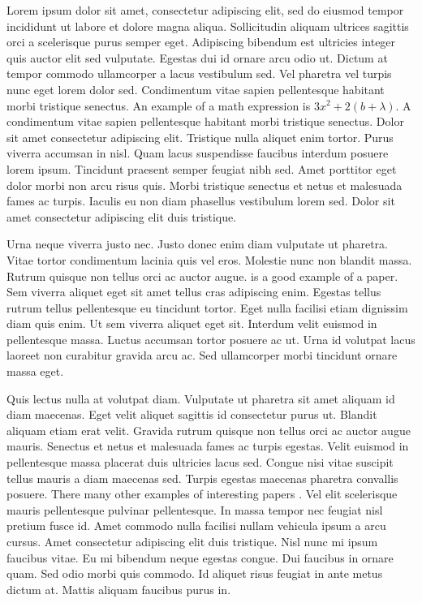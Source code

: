 \documentclass[12pt, letterpaper]{article}
\begin{document}
Lorem ipsum dolor sit amet, consectetur adipiscing elit, sed do eiusmod tempor 
incididunt ut labore et dolore magna aliqua. Sollicitudin aliquam ultrices 
sagittis orci a scelerisque purus semper eget. Adipiscing bibendum est ultricies 
integer quis auctor elit sed vulputate. Egestas dui id ornare arcu odio ut. 
Dictum at tempor commodo ullamcorper a lacus vestibulum sed. Vel pharetra vel 
turpis nunc eget lorem dolor sed. Condimentum vitae sapien pellentesque habitant 
morbi tristique senectus. An example of a math expression is 
$3x^2 + 2(b + \lambda)$. A condimentum vitae 
sapien pellentesque habitant morbi 
tristique senectus. Dolor sit amet consectetur adipiscing elit. Tristique nulla 
aliquet enim tortor. Purus viverra accumsan in nisl. Quam lacus suspendisse 
faucibus interdum posuere lorem ipsum. Tincidunt praesent semper feugiat nibh 
sed. Amet porttitor eget dolor morbi non arcu risus quis. Morbi tristique 
senectus et netus et malesuada fames ac turpis. Iaculis eu non diam phasellus 
vestibulum lorem sed. Dolor sit amet consectetur adipiscing elit duis tristique.

Urna neque viverra justo nec. Justo donec enim diam vulputate ut pharetra. Vitae 
tortor condimentum lacinia quis vel eros. Molestie nunc non blandit massa. 
Rutrum quisque non tellus orci ac auctor augue. \citet{westgate2013travel} is a
good example of a paper. Sem viverra aliquet 
eget sit amet tellus cras adipiscing enim. Egestas tellus rutrum tellus 
pellentesque eu tincidunt tortor. Eget nulla facilisi etiam dignissim diam quis 
enim. Ut sem viverra aliquet eget sit. Interdum velit euismod in pellentesque 
massa. Luctus accumsan tortor posuere ac ut. Urna id volutpat lacus laoreet non 
curabitur gravida arcu ac. Sed ullamcorper morbi tincidunt ornare massa eget.

Quis lectus nulla at volutpat diam. Vulputate ut pharetra sit amet aliquam id 
diam maecenas. Eget velit aliquet sagittis id consectetur purus ut. Blandit 
aliquam etiam erat velit. Gravida rutrum quisque non tellus orci ac auctor augue 
mauris. Senectus et netus et malesuada fames ac turpis egestas. Velit euismod in 
pellentesque massa placerat duis ultricies lacus sed. Congue nisi vitae suscipit 
tellus mauris a diam maecenas sed. Turpis egestas maecenas pharetra convallis 
posuere. There many other examples of interesting papers 
\citep{alfons2013sparse}. Vel elit 
scelerisque mauris pellentesque pulvinar pellentesque. In 
massa tempor nec feugiat nisl pretium fusce id. Amet commodo nulla facilisi 
nullam vehicula ipsum a arcu cursus. Amet consectetur adipiscing elit duis 
tristique. Nisl nunc mi ipsum faucibus vitae. Eu mi bibendum neque egestas 
congue. Dui faucibus in ornare quam. Sed odio morbi quis commodo. Id aliquet 
risus feugiat in ante metus dictum at. Mattis aliquam faucibus purus in.
\end{document}
